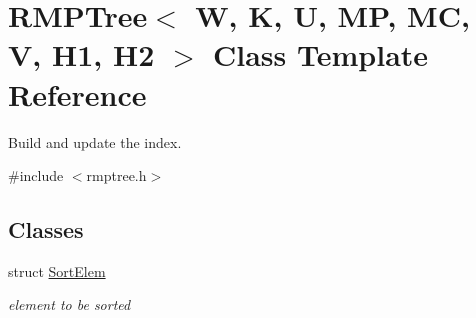 \hypertarget{classRMPTree}{\section{R\-M\-P\-Tree$<$ W, K, U, M\-P, M\-C, V, H1, H2 $>$ Class Template Reference}
\label{classRMPTree}
}


Build and update the index.  




{\ttfamily \#include $<$rmptree.\-h$>$}

\subsection*{Classes}
\begin{DoxyCompactItemize}
\item 
struct \hyperlink{structRMPTree_1_1SortElem}{Sort\-Elem}
\begin{DoxyCompactList}\small\item\em element to be sorted \end{DoxyCompactList}\end{DoxyCompactItemize}
